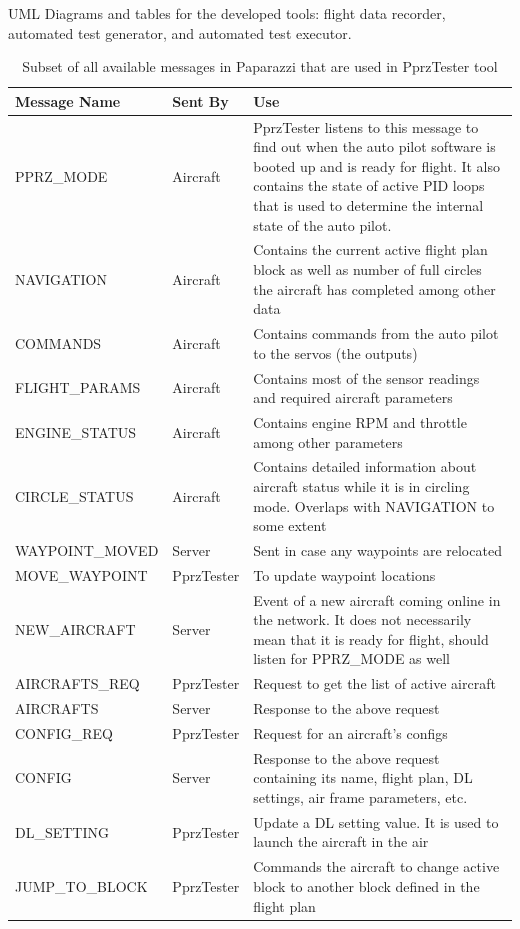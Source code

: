 UML Diagrams and tables for the developed tools: flight data recorder, automated test generator, and automated test executor.
\begin{table}
    \centering
\begin{longtable}{llp{}}
\toprule
\textbf{Message Name }   & \textbf{Sent By }    & \textbf{Use}                                                                     \\ \hline
\endhead
%
\hline
\endfoot
%
\endlastfoot
%
PPRZ\_MODE &
  Aircraft &
  PprzTester listens to this message to find out when the auto pilot software is booted up and is ready for flight. It also contains the state of active PID loops that is used to determine the internal state of the auto pilot. \\
NAVIGATION &
  Aircraft &
  Contains the current active flight plan block as well as number of full circles the aircraft has completed among other data \\
COMMANDS        & Aircraft    & Contains commands from the auto pilot to the servos (the outputs)       \\
FLIGHT\_PARAMS  & Aircraft    & Contains most of the sensor readings and required aircraft parameters   \\
ENGINE\_STATUS  & Aircraft    & Contains engine RPM and throttle among other parameters                 \\
CIRCLE\_STATUS &
  Aircraft &
  Contains detailed information about aircraft status while it is in circling mode. Overlaps with NAVIGATION to some extent \\
WAYPOINT\_MOVED & Server      & Sent in case any waypoints are relocated                                \\
MOVE\_WAYPOINT  & PprzTester & To update waypoint locations                                            \\
NEW\_AIRCRAFT &
  Server &
  Event of a new aircraft coming online in the network. It does not necessarily mean that it is ready for flight, should listen for PPRZ\_MODE as well \\
AIRCRAFTS\_REQ  & PprzTester & Request to get the list of active aircraft                              \\
AIRCRAFTS       & Server      & Response to the above request                                           \\
CONFIG\_REQ     & PprzTester & Request for an aircraft's configs                                       \\
CONFIG &
  Server &
  Response to the above request containing  its name, flight plan, DL settings, air frame parameters, etc. \\
DL\_SETTING     & PprzTester & Update a DL setting value. It is used to launch the aircraft in the air \\
JUMP\_TO\_BLOCK & PprzTester & Commands the aircraft to change active block to another block defined in the flight plan  \\ \bottomrule
\end{longtable}
\caption{Subset of all available messages in Paparazzi that are used in PprzTester tool}
\label{tab:pprz_messages}
\end{table}

